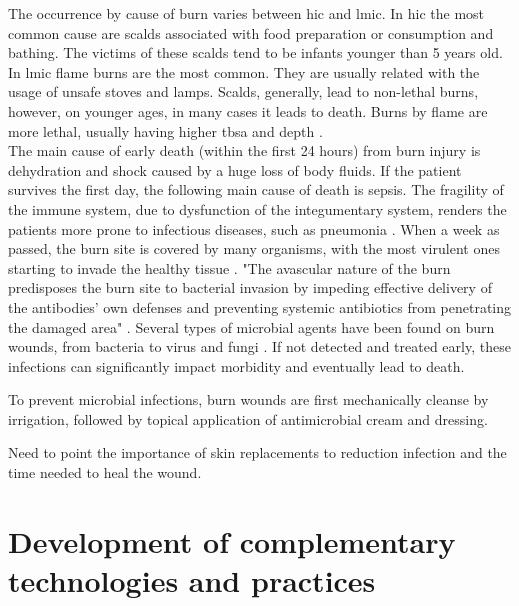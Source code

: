 The occurrence by cause of burn varies between \gls{hic} and \gls{lmic}. In \gls{hic} the most common cause are scalds associated with food preparation or consumption and bathing. The victims of these scalds tend to be infants younger than 5 years old. In \gls{lmic} flame burns are the most common. They are usually related with the usage of unsafe stoves and lamps. Scalds, generally, lead to non-lethal burns, however, on younger ages, in many cases it leads to death. Burns by flame are more lethal, usually having higher \gls{tbsa} and depth \cite{who2011_sucess_stories, who_unicef2008_burns_chapter}.\\

The main cause of early death (within the first 24 hours) from burn injury is dehydration and shock caused by a huge loss of body fluids. If the patient survives the first day, the following main cause of death is sepsis. The fragility of the immune system, due to dysfunction of the integumentary system, renders the patients more prone to infectious diseases, such as pneumonia \cite{who2011_sucess_stories}. When a week as passed, the burn site is covered by many organisms, with the most virulent ones starting to invade the healthy tissue \cite{isbi_guidelines_burn_care}. "The avascular nature of the burn predisposes the burn site to bacterial invasion by impeding effective delivery of the antibodies’ own defenses and preventing systemic antibiotics from penetrating the damaged area" \cite{isbi_guidelines_burn_care}. Several types of microbial agents have been found on burn wounds, from bacteria to virus and fungi \cite{Schaal2015a_fungal_infections,Shoja2017_acinetobacter}. If not detected and treated early, these infections can significantly impact morbidity and eventually lead to death.

To prevent microbial infections, burn wounds are first mechanically cleanse by irrigation, followed by topical application of antimicrobial cream and dressing. 

{\color{red}Need to point the importance of skin replacements to reduction infection and the time needed to heal the wound.}




\section{Development of complementary technologies and practices} %
\label{sec:development_of_complementary_technologies_and_practices}

